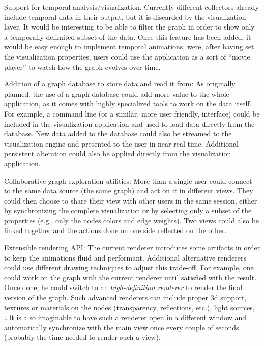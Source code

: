 Support for temporal analysis/visualization. Currently different collectors already include temporal data in their output, but it is discarded by the visualization layer. It would be interesting to be able to filter the graph in order to show only a temporally delimited subset of the data. Once this feature has been added, it would be easy enough to implement temporal animations, were, after having set the visualization properties, users could use the application as a sort of ``movie player'' to watch how the graph evolves over time.
    
Addition of a graph database to store data and read it from: As originally planned, the use of a graph database could add more value to the whole application, as it comes with highly specialized tools to work on the data itself. For example, a command line (or a similar, more user friendly, interface) could be included in the visualization application and used to load data directly from the database. New data added to the database could also be streamed to the visualization engine and presented to the user in near real-time. Additional persistent alteration could also be applied directly from the visualization application.

Collaborative graph exploration utilities: More than a single user could connect to the same data source (the same graph) and act on it in different views. They could then choose to share their view with other users in the same session, either by synchronizing the complete visualization or by selecting only a subset of the  properties (e.g., only the nodes colors and edge weights). Two views could also be linked together and the actions done on one side reflected on the other.

Extensible rendering API: The current renderer introduces some artifacts in order to keep the animations fluid and performant. Additional alternative renderers could use different drawing techniques to adjust this trade-off. For example, one could work on the graph with the current renderer until satisfied with the result. Once done, he could switch to an \emph{high-definition renderer} to render the final version of the graph. Such advanced renderers can include proper \gls{3d} support, textures or materials on the nodes (transparency, reflections, etc.), light sources, \ldots It is also imaginable to have such a renderer open in a different window and automatically synchronize with the main view once every couple of seconds (probably the time needed to render such a view).

